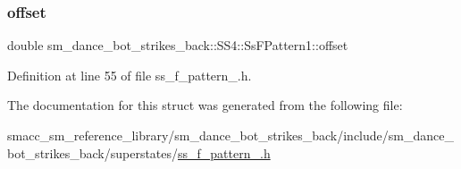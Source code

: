 \subsubsection{\texorpdfstring{offset}{offset}}
{\footnotesize\ttfamily double sm\+\_\+dance\+\_\+bot\+\_\+strikes\+\_\+back\+::\+S\+S4\+::\+Ss\+F\+Pattern1\+::offset}



Definition at line 55 of file ss\+\_\+f\+\_\+pattern\+\_.\+h.



The documentation for this struct was generated from the following file\+:\begin{DoxyCompactItemize}
\item 
smacc\+\_\+sm\+\_\+reference\+\_\+library/sm\+\_\+dance\+\_\+bot\+\_\+strikes\+\_\+back/include/sm\+\_\+dance\+\_\+bot\+\_\+strikes\+\_\+back/superstates/\hyperlink{strikes__back_2include_2sm__dance__bot__strikes__back_2superstates_2ss__f__pattern__1_8h}{ss\+\_\+f\+\_\+pattern\+\_.\+h}\end{DoxyCompactItemize}
